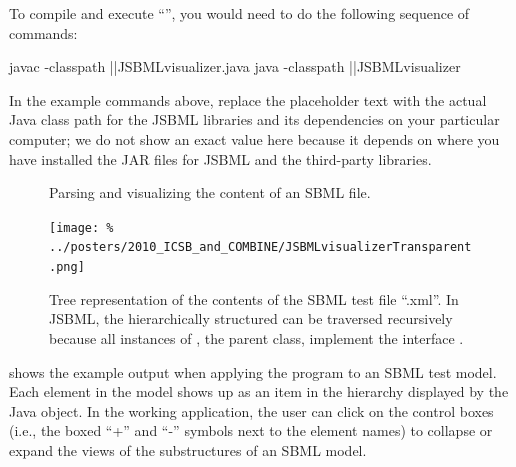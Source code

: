 To compile and execute ``'', you would need to do
the following sequence of commands:

\newcommand{\classpath}{\code{\emph{\color{winered}classpath}}\xspace}

\begin{example}[style=bash, title={Compiling and executing the example program.}]
  javac -classpath |\classpath|JSBMLvisualizer.java
  java -classpath |\classpath|JSBMLvisualizer
\end{example}

In the example commands above, replace the placeholder text \classpath with
the actual Java class path for the JSBML libraries and its dependencies on
your particular computer; we do not show an exact value here because it
depends on where you have installed the JAR files for JSBML and the
third-party libraries.

\begin{figure}[ht]
  \caption{Parsing and visualizing the content of an SBML file.}
  \label{fig:JSBMLvisualizer-source}
\end{figure}

\begin{figure}
  \centering
  \vspace*{-1em}
  \setlength{\captionmargin}{1.8em}
  \texttt{[image: \%
    ../posters/2010\_ICSB\_and\_COMBINE/JSBMLvisualizerTransparent.png]}
  \caption[Tree representation of an SBML file]{Tree representation of
    the contents of the SBML test file ``.xml''. In JSBML,
    the hierarchically structured \SBMLDocument can be traversed
    recursively because all instances of \SBase, the parent class,
    implement the interface \TreeNode.}
  \label{fig:JSBMLvisualizer-output}
\end{figure}
 shows the example output when
applying the program to an SBML test model.  Each
element in the model shows up as an item in the hierarchy displayed by the
Java \JTree object. In the working application, the user can click on the
control boxes (i.e., the boxed ``+'' and ``-'' symbols next to the element
names) to collapse or expand the views of the substructures of an SBML
model.

